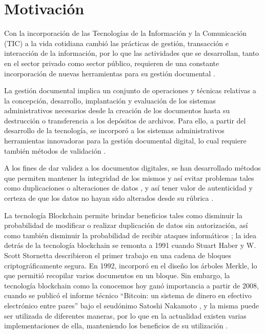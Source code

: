 \section{Motivación}

Con la incorporación de las Tecnologías de la Información y 
la Comunicación (TIC) a la vida cotidiana cambió las 
prácticas de gestión, transacción e interacción de la información,
por lo que las actividades que se desarrollan, tanto en el 
sector privado como sector público, requieren de una constante 
incorporación de nuevas herramientas para su gestión documental \cite[]{gauchi_risso_aproximacion_2012}.

La gestión documental implica un conjunto de operaciones y 
técnicas relativas a la concepción, desarrollo, implantación y 
evaluación de los sistemas administrativos necesarios desde la 
creación de los documentos hasta su destrucción o transferencia a 
los depósitos de archivos. Para ello, a partir del desarrollo de la tecnología,
se incorporó a  los sistemas administrativos herramientas 
innovadoras para la gestión documental digital, lo cual 
requiere también métodos de validación \cite[]{drescher_Blockchain_2017,retamal_Blockchain_2017}.

A los fines de dar validez a los documentos digitales, se han 
desarrollado métodos que permiten mantener la integridad de los 
mismos y así evitar problemas tales como duplicaciones o 
alteraciones de datos   
, y así tener valor de autenticidad y certeza de que los datos no hayan sido alterados desde su rúbrica
\cite[]{drescher_Blockchain_2017,retamal_Blockchain_2017,avila_implementacion_2015}.

La tecnología  Blockchain  permite brindar beneficios tales como 
disminuir la probabilidad de modificar o realizar duplicación de 
datos sin autorización, así como también disminuir la probabilidad 
de recibir ataques informáticos \cite[]{drescher_Blockchain_2017,retamal_Blockchain_2017,badreddin_Blockchain_2018,choo_Blockchain_2020}   
; la idea detrás de la tecnología blockchain se remonta a 1991 cuando Stuart Haber y
W. Scott Stornetta describieron el primer trabajo en una cadena de bloques
criptográficamente segura. En 1992, incorporó en el diseño los árboles Merkle, lo que permitió recopilar varios documentos en un bloque.
Sin embargo, la tecnología blockchain como la conocemos hoy ganó importancia a partir de 2008, cuando se publicó el informe técnico 
“Bitcoin: un sistema de dinero en efectivo electrónico entre pares” bajo el seudónimo Satoshi Nakamoto \cite[]{alice_blockchain_2021}, y la misma puede ser 
utilizada de diferentes maneras, por lo que en la actualidad 
existen varias implementaciones de ella, manteniendo los 
beneficios de su utilización \cite[]{Blockchain_federal_argentina_bfa_2020,dannen_introducing_2017}.

